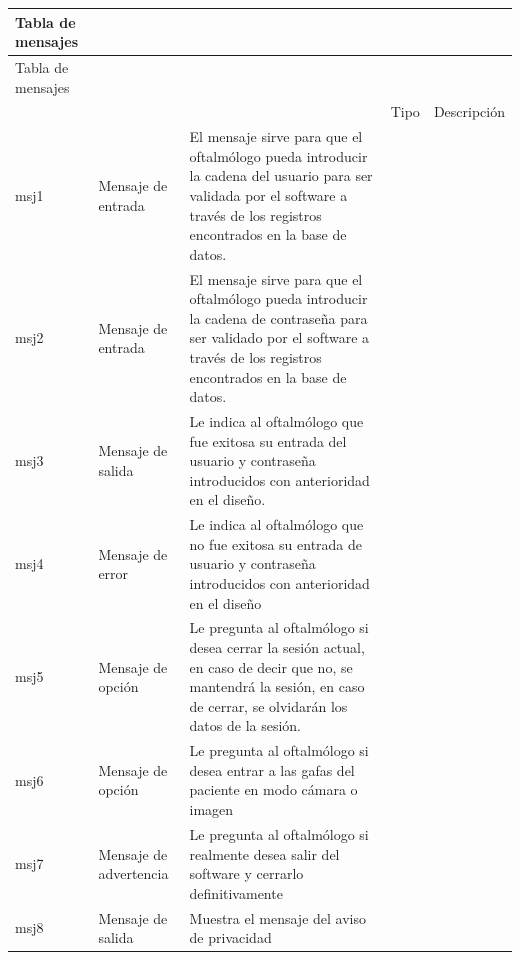 \documentclass[10pt]{article}
\begin{document}
\begin{longtable}{|p{5.0cm}|p{3.5cm}|p{6.5cm}|}
\hline
Tabla de mensajes\\
\hline 
\endfirsthead

\hline

Tabla de mensajes\\
\hline 
\endhead

\multicolumn{3}{c}{}
\endfoot

\endlastfoot
\hline
ID & Tipo & Descripción\\
\hline

msj1 & Mensaje de entrada & El mensaje sirve para que el oftalmólogo pueda introducir la cadena del usuario para ser validada por el software a través de los registros encontrados en la base de datos.\\
\hline

msj2 & Mensaje de entrada & El mensaje sirve para que el oftalmólogo pueda introducir la cadena de contraseña para ser validado por el software a través de los registros encontrados en la base de datos.\\
\hline

msj3 & Mensaje de salida & Le indica al oftalmólogo que fue exitosa su entrada del usuario y contraseña introducidos con anterioridad en el diseño. \\
\hline

msj4 & Mensaje de error & Le indica al oftalmólogo que no fue exitosa su entrada de usuario y contraseña introducidos con anterioridad en el diseño\\
\hline

msj5 & Mensaje de opción & Le pregunta al oftalmólogo si desea cerrar la sesión actual, en caso de decir que no, se mantendrá la sesión, en caso de cerrar, se olvidarán los datos de la sesión.\\
\hline

msj6 & Mensaje de opción & Le pregunta al oftalmólogo si desea entrar a las gafas del paciente en modo cámara o imagen \\
\hline

msj7 & Mensaje de advertencia & Le pregunta al oftalmólogo si realmente desea salir del software y cerrarlo definitivamente \\
\hline

msj8 & Mensaje de salida & Muestra el mensaje del aviso de privacidad \\
\hline


\end{longtable}
\end{document}
